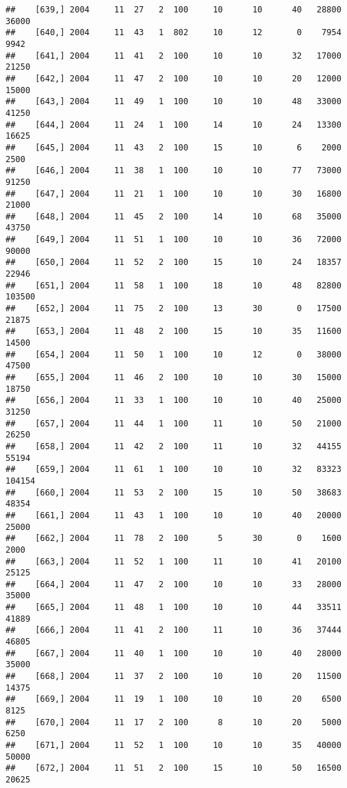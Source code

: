 \documentclass{article}\usepackage[]{graphicx}\usepackage[]{color}
\makeatletter
\newenvironment{kframe}{%
 \def\at@end@of@kframe{}%
 \ifinner\ifhmode%
  \def\at@end@of@kframe{\end{minipage}}%
  \begin{minipage}{\columnwidth}%
 \fi\fi%
 \def\FrameCommand##1{\hskip\@totalleftmargin \hskip-\fboxsep
 \colorbox{shadecolor}{##1}\hskip-\fboxsep
     \hskip-\linewidth \hskip-\@totalleftmargin \hskip\columnwidth}%
 \MakeFramed {\advance\hsize-\width
   \@totalleftmargin\z@ \linewidth\hsize
   \@setminipage}}%
 {\par\unskip\endMakeFramed%
 \at@end@of@kframe}
\newenvironment{knitrout}{}{} %
\makeatother
\begin{document}
\begin{knitrout}
\begin{kframe}
\begin{verbatim}
##    [639,] 2004     11  27   2  100     10      10      40   28800   36000
##    [640,] 2004     11  43   1  802     10      12       0    7954    9942
##    [641,] 2004     11  41   2  100     10      10      32   17000   21250
##    [642,] 2004     11  47   2  100     10      10      20   12000   15000
##    [643,] 2004     11  49   1  100     10      10      48   33000   41250
##    [644,] 2004     11  24   1  100     14      10      24   13300   16625
##    [645,] 2004     11  43   2  100     15      10       6    2000    2500
##    [646,] 2004     11  38   1  100     10      10      77   73000   91250
##    [647,] 2004     11  21   1  100     10      10      30   16800   21000
##    [648,] 2004     11  45   2  100     14      10      68   35000   43750
##    [649,] 2004     11  51   1  100     10      10      36   72000   90000
##    [650,] 2004     11  52   2  100     15      10      24   18357   22946
##    [651,] 2004     11  58   1  100     18      10      48   82800  103500
##    [652,] 2004     11  75   2  100     13      30       0   17500   21875
##    [653,] 2004     11  48   2  100     15      10      35   11600   14500
##    [654,] 2004     11  50   1  100     10      12       0   38000   47500
##    [655,] 2004     11  46   2  100     10      10      30   15000   18750
##    [656,] 2004     11  33   1  100     10      10      40   25000   31250
##    [657,] 2004     11  44   1  100     11      10      50   21000   26250
##    [658,] 2004     11  42   2  100     11      10      32   44155   55194
##    [659,] 2004     11  61   1  100     10      10      32   83323  104154
##    [660,] 2004     11  53   2  100     15      10      50   38683   48354
##    [661,] 2004     11  43   1  100     10      10      40   20000   25000
##    [662,] 2004     11  78   2  100      5      30       0    1600    2000
##    [663,] 2004     11  52   1  100     11      10      41   20100   25125
##    [664,] 2004     11  47   2  100     10      10      33   28000   35000
##    [665,] 2004     11  48   1  100     10      10      44   33511   41889
##    [666,] 2004     11  41   2  100     11      10      36   37444   46805
##    [667,] 2004     11  40   1  100     10      10      40   28000   35000
##    [668,] 2004     11  37   2  100     10      10      20   11500   14375
##    [669,] 2004     11  19   1  100     10      10      20    6500    8125
##    [670,] 2004     11  17   2  100      8      10      20    5000    6250
##    [671,] 2004     11  52   1  100     10      10      35   40000   50000
##    [672,] 2004     11  51   2  100     15      10      50   16500   20625

\end{verbatim}
\end{kframe}
\end{knitrout}
\end{document}
